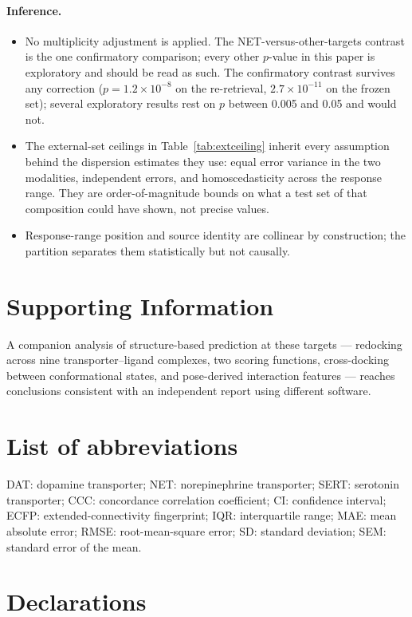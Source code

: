 \documentclass[11pt,a4paper]{article}
\begin{document}
\paragraph{Inference.}
\begin{itemize}\setlength\itemsep{0.15em}
\item No multiplicity adjustment is applied. The NET-versus-other-targets contrast is the
one confirmatory comparison; every other $p$-value in this paper is exploratory and should
be read as such. The confirmatory contrast survives any correction
($p=1.2\times10^{-8}$ on the re-retrieval, $2.7\times10^{-11}$ on the frozen set); several
exploratory results rest on $p$ between 0.005 and 0.05 and would not.
\item The external-set ceilings in Table~\ref{tab:extceiling} inherit every assumption
behind the dispersion estimates they use: equal error variance in the two modalities,
independent errors, and homoscedasticity across the response range. They are
order-of-magnitude bounds on what a test set of that composition could have shown, not
precise values.
\item Response-range position and source identity are collinear by construction; the
partition separates them statistically but not causally.
\end{itemize}

\section*{Supporting Information}
A companion analysis of structure-based prediction at these targets --- redocking across
nine transporter--ligand complexes, two scoring functions,\cite{Trott2010,Eberhardt2021,Quiroga2016}
cross-docking between conformational states, and pose-derived interaction features ---
reaches conclusions consistent with an independent report using different
software.\cite{Pazos2026}

\section*{List of abbreviations}
DAT: dopamine transporter; NET: norepinephrine transporter; SERT: serotonin
transporter; CCC: concordance correlation coefficient; CI: confidence interval;
ECFP: extended-connectivity fingerprint; IQR: interquartile range; MAE: mean absolute
error; RMSE: root-mean-square error; SD: standard deviation; SEM: standard error of
the mean.

\section*{Declarations}
\end{document}
